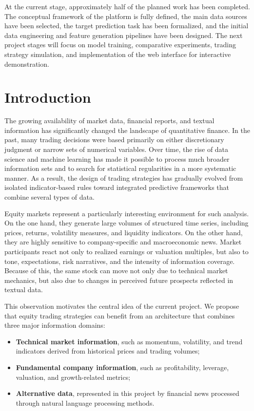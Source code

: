 \documentclass[12pt,a4paper]{article}
\begin{document}
At the current stage, approximately half of the planned work has been completed. The conceptual framework of the platform is fully defined, the main data sources have been selected, the target prediction task has been formalized, and the initial data engineering and feature generation pipelines have been designed. The next project stages will focus on model training, comparative experiments, trading strategy simulation, and implementation of the web interface for interactive demonstration.

\section{Introduction}

The growing availability of market data, financial reports, and textual information has significantly changed the landscape of quantitative finance. In the past, many trading decisions were based primarily on either discretionary judgment or narrow sets of numerical variables. Over time, the rise of data science and machine learning has made it possible to process much broader information sets and to search for statistical regularities in a more systematic manner. As a result, the design of trading strategies has gradually evolved from isolated indicator-based rules toward integrated predictive frameworks that combine several types of data.

Equity markets represent a particularly interesting environment for such analysis. On the one hand, they generate large volumes of structured time series, including prices, returns, volatility measures, and liquidity indicators. On the other hand, they are highly sensitive to company-specific and macroeconomic news. Market participants react not only to realized earnings or valuation multiples, but also to tone, expectations, risk narratives, and the intensity of information coverage. Because of this, the same stock can move not only due to technical market mechanics, but also due to changes in perceived future prospects reflected in textual data.

This observation motivates the central idea of the current project. We propose that equity trading strategies can benefit from an architecture that combines three major information domains:

\begin{itemize}[leftmargin=1.2cm]
    \item \textbf{Technical market information}, such as momentum, volatility, and trend indicators derived from historical prices and trading volumes;
    \item \textbf{Fundamental company information}, such as profitability, leverage, valuation, and growth-related metrics;
    \item \textbf{Alternative data}, represented in this project by financial news processed through natural language processing methods.
\end{itemize}
\end{document}
